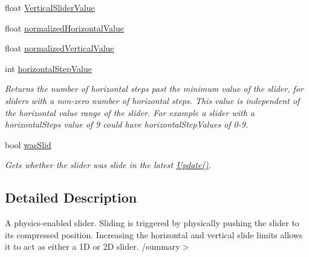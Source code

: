 \begin{DoxyCompactItemize}
float \mbox{\hyperlink{class_leap_1_1_unity_1_1_interaction_1_1_interaction_slider_ae89da2e5a3a6a9c9182ea5169614bf79}{Vertical\+Slider\+Value}}
\item 
float \mbox{\hyperlink{class_leap_1_1_unity_1_1_interaction_1_1_interaction_slider_a99d0b70094955c67a7b1a21cf154a30d}{normalized\+Horizontal\+Value}}
\item 
float \mbox{\hyperlink{class_leap_1_1_unity_1_1_interaction_1_1_interaction_slider_ad1e522381654bdcdb1e04876a0cc385b}{normalized\+Vertical\+Value}}
\item 
int \mbox{\hyperlink{class_leap_1_1_unity_1_1_interaction_1_1_interaction_slider_ad187d79e89f3bd2784d9021c2de30238}{horizontal\+Step\+Value}}
\begin{DoxyCompactList}\small\item\em Returns the number of horizontal steps past the minimum value of the slider, for sliders with a non-\/zero number of horizontal steps. This value is independent of the horizontal value range of the slider. For example a slider with a horizontal\+Steps value of 9 could have horizontal\+Step\+Values of 0-\/9. \end{DoxyCompactList}\item 
bool \mbox{\hyperlink{class_leap_1_1_unity_1_1_interaction_1_1_interaction_slider_a0fe4068b54cb45ed1bc4132fd3d0c9af}{was\+Slid}}
\begin{DoxyCompactList}\small\item\em Gets whether the slider was slide in the latest \mbox{\hyperlink{class_leap_1_1_unity_1_1_interaction_1_1_interaction_slider_af07f856388385d64cdd47e6c917308a8}{Update()}}. \end{DoxyCompactList}\end{DoxyCompactItemize}


\subsection{Detailed Description}
A physics-\/enabled slider. Sliding is triggered by physically pushing the slider to its compressed position. Increasing the horizontal and vertical slide limits allows it to act as either a 1D or 2D slider. /summary$>$ 

